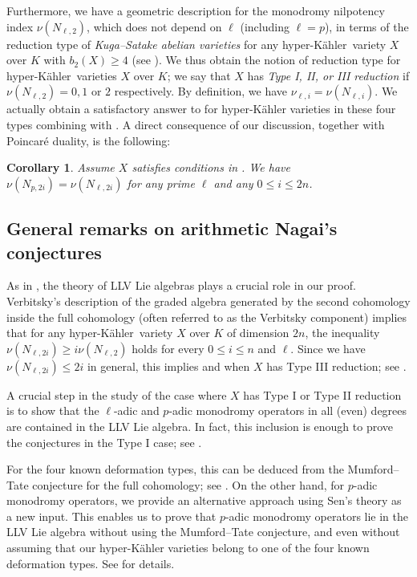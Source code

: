 \documentclass[12pt,reqno]{amsart}
\newtheorem{cor}[thm]{Corollary}
\theoremstyle{definition}
\newcommand{\hk}{hyper-Kähler~}
\numberwithin{equation}{section}
\begin{document}
Furthermore, we have a geometric description for the monodromy nilpotency index $\nu(N_{\ell,2})$, which does not depend on $\ell$ (including $\ell = p$), in terms of the reduction type of \emph{Kuga--Satake abelian varieties} for any \hk variety $X$ over $K$ with $b_2(X) \geq 4$ (see ).
We thus obtain the notion of reduction type for \hk varieties $X$ over $K$; we say that $X$ has \emph{Type I, II, or III reduction} if $\nu(N_{\ell,2})= 0,1 \text{ or } 2$ respectively. %
By definition, we have $\nu_{\ell,i} = \nu(N_{\ell,i})$. We actually obtain a satisfactory answer to  for hyper-Kähler varieties in these four types combining with .
A direct consequence of our discussion, together with Poincaré duality, is the following:

\begin{cor}
Assume $X$ satisfies conditions in . We have
$
\nu(N_{p,2i}) = \nu(N_{\ell,2i}) 
$
for any prime $\ell$ and any $0 \leq i \leq 2n$.
\end{cor}


\subsection{General remarks on arithmetic Nagai's conjectures}


As in \cite{GKLR}, the theory of LLV Lie algebras plays a crucial role in our proof.
Verbitsky’s description of the graded algebra generated by the second cohomology inside the full cohomology (often referred to as the Verbitsky component) implies that for any \hk variety $X$ over $K$ of dimension $2n$, 
the inequality
$\nu(N_{\ell, 2i}) \geq i \nu(N_{\ell, 2})$
holds for every $0 \leq i \leq n$ and $\ell$.
Since we have $\nu(N_{\ell, 2i}) \leq 2i$ in general, this implies 
and 
 when $X$ has Type III reduction; see .


A crucial step in the study of the case where $X$ has Type I or Type II reduction is to show that the $\ell$-adic and $p$-adic monodromy operators in all (even) degrees are contained in the LLV Lie algebra.
In fact, this inclusion is enough to prove the conjectures in the Type I case; see .

For the four known deformation types, this can be deduced from the Mumford--Tate conjecture for the full cohomology; see .
On the other hand, for $p$-adic monodromy operators, we provide an alternative approach using Sen's theory as a new input.
This enables us to prove that $p$-adic monodromy operators lie in the LLV Lie algebra without using the Mumford--Tate conjecture, and even without assuming that our hyper-Kähler varieties belong to one of the four known deformation types.
See  for details.
\end{document}
